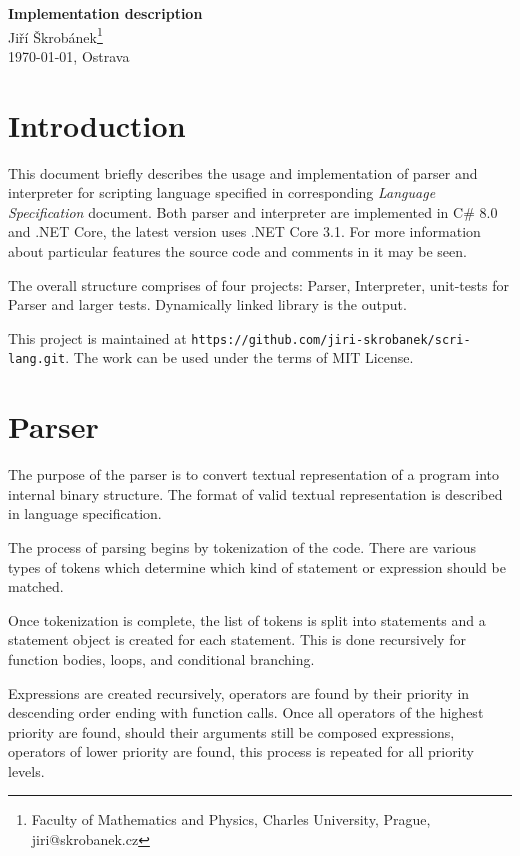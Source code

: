 \documentclass[a4paper,11pt,openany]{article}
\begin{document}
\begin{center}
{\huge \textbf{Implementation description}}\\
\vspace{10mm} {\large Jiří Škrobánek\footnote[1]{Faculty of Mathematics and Physics, Charles University, Prague, {\ttfamily jiri@skrobanek.cz}}}\\
\vspace{10mm}\today, Ostrava
\end{center}
	
\section*{Introduction}
	
This document briefly describes the usage and implementation of parser and interpreter for scripting language specified in corresponding \textit{Language Specification} document. Both parser and interpreter are implemented in C\# 8.0 and .NET Core, the latest version uses .NET Core 3.1. For more information about particular features the source code and comments in it may be seen.

The overall structure comprises of four projects: Parser, Interpreter, unit-tests for Parser and larger tests. Dynamically linked library is the output.

This project is maintained at \texttt{https://github.com/jiri-skrobanek/scri-lang.git}. The work can be used under the terms of MIT License.

\section*{Parser}

The purpose of the parser is to convert textual representation of a program into internal binary structure. The format of valid textual representation is described in language specification.

The process of parsing begins by tokenization of the code. There are various types of tokens which determine which kind of statement or expression should be matched.

Once tokenization is complete, the list of tokens is split into statements and a statement object is created for each statement. This is done recursively for function bodies, loops, and conditional branching.

Expressions are created recursively, operators are found by their priority in descending order ending with function calls. Once all operators of the highest priority are found, should their arguments still be composed expressions, operators of lower priority are found, this process is repeated for all priority levels.
\end{document}
